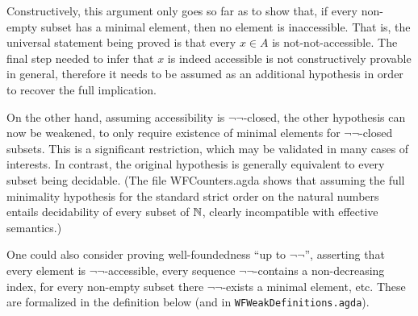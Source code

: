 Constructively, this argument only goes so far as to show that, if every non-empty
subset has a minimal element, then no element is inaccessible.
That is, the universal statement being proved is that every $x \in A$
is not-not-accessible. The final step needed to infer that $x$ is indeed accessible
is not constructively provable in general, therefore it needs to be assumed as
an additional hypothesis in order to recover the full implication.

On the other hand, assuming accessibility is $\lnot\lnot$-closed, the other
hypothesis can now be weakened, to only require existence of minimal elements
for $\lnot\lnot$-closed subsets.  This is a significant restriction, which may
be validated in many cases of interests.  In contrast, the original hypothesis
is generally equivalent to every subset being decidable.
(The file WFCounters.agda shows that assuming the full minimality hypothesis
for the standard strict order on the natural numbers entails decidability
of every subset of $\mathbb{N}$, clearly incompatible with effective semantics.)

One could also consider proving well-foundedness ``up to $\lnot\lnot$'',
asserting that every element is $\lnot\lnot$-accessible,
every sequence $\lnot\lnot$-contains a non-decreasing index,
for every non-empty subset there $\lnot\lnot$-exists a minimal element, etc. These are formalized in the definition below (and in \texttt{WFWeakDefinitions.agda}). 

